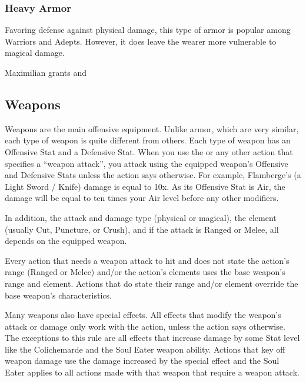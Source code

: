 \clearpage
\subsubsection{Heavy Armor}

Favoring defense against physical damage, this type of armor is popular among Warriors and Adepts.  However, it does leave the wearer more vulnerable to magical damage.

\begin{tabarm}[label=inv-harm]
    
\end{tabarm}
{\footnotesize Maximilian grants  and }
\clearpage

\subsection{Weapons}\label{subsec:inv-weapons}

\begin{multicols}{2}
Weapons are the main offensive equipment.  Unlike armor, which are very similar, each type of weapon is quite different from others.  Each type of weapon has an Offensive Stat and a Defensive Stat.  When you use the  or any other action that specifies a ``weapon attack'', you attack using the equipped weapon's Offensive and Defensive Stats unless the action says otherwise.  For example, Flamberge's (a Light Sword / Knife) damage is equal to 10x.  As its Offensive Stat is Air, the damage will be equal to ten times your Air level before any other modifiers.

In addition, the attack and damage type (physical or magical), the element (usually Cut, Puncture, or Crush), and if the attack is Ranged or Melee, all depends on the equipped weapon.

Every action that needs a weapon attack to hit and does not state the action's range (Ranged or Melee) and/or the action's elements uses the base weapon's range and element.  Actions that do state their range and/or element override the base weapon's characteristics.

Many weapons also have special effects.  All effects that modify the weapon's attack or damage only work with the  action, unless the action says otherwise.  The exceptions to this rule are all effects that increase damage by some Stat level like the Colichemarde and the Soul Eater weapon ability.  Actions that key off weapon damage use the damage increased by the special effect and the Soul Eater applies to all actions made with that weapon that require a weapon attack.
\end{multicols}
\begin{center}
\end{center}
\clearpage
